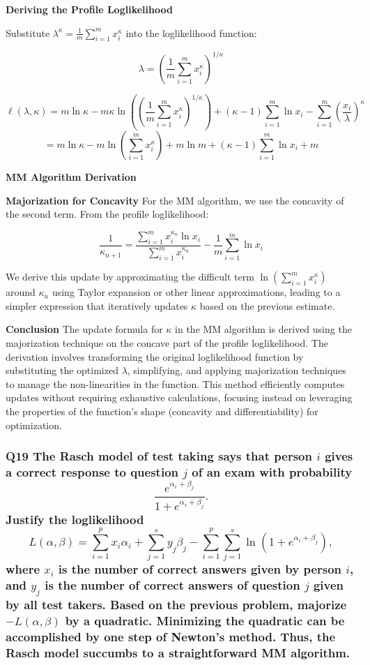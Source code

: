 \documentclass[8pt]{article}
\begin{document}
{\textbf{Deriving the Profile Loglikelihood}

Substitute \(\lambda^\kappa = \frac{1}{m} \sum_{i=1}^m x_i^\kappa\) into the loglikelihood function:

\[
\lambda = \left(\frac{1}{m} \sum_{i=1}^m x_i^\kappa\right)^{1/\kappa}
\]

\[
\ell(\lambda, \kappa) = m \ln \kappa - m \kappa \ln \left( \left(\frac{1}{m} \sum_{i=1}^m x_i^\kappa\right)^{1/\kappa} \right) + (\kappa - 1) \sum_{i=1}^m \ln x_i - \sum_{i=1}^m \left(\frac{x_i}{\lambda}\right)^\kappa
\]
\[
= m \ln \kappa - m \ln \left( \sum_{i=1}^m x_i^\kappa \right) + m \ln m + (\kappa - 1) \sum_{i=1}^m \ln x_i + m
\]

\textbf{MM Algorithm Derivation}

\textbf{Majorization for Concavity}
For the MM algorithm, we use the concavity of the second term. From the profile loglikelihood:

\[
\frac{1}{\kappa_{n+1}} = \frac{\sum_{i=1}^m x_i^{\kappa_n} \ln x_i}{\sum_{i=1}^m x_i^{\kappa_n}} - \frac{1}{m} \sum_{i=1}^m \ln x_i
\]

We derive this update by approximating the difficult term \(\ln \left(\sum_{i=1}^m x_i^\kappa\right)\) around \(\kappa_n\) using Taylor expansion or other linear approximations, leading to a simpler expression that iteratively updates \(\kappa\) based on the previous estimate.

\textbf{Conclusion}
The update formula for \(\kappa\) in the MM algorithm is derived using the majorization technique on the concave part of the profile loglikelihood. The derivation involves transforming the original loglikelihood function by substituting the optimized \(\lambda\), simplifying, and applying majorization techniques to manage the non-linearities in the function. This method efficiently computes updates without requiring exhaustive calculations, focusing instead on leveraging the properties of the function's shape (concavity and differentiability) for optimization.

\subsubsection*{Q19 The Rasch model of test taking says that person \(i\) gives a correct response to question \(j\) of an exam with probability
\[
\frac{e^{\alpha_i + \beta_j}}{1 + e^{\alpha_i + \beta_j}}.
\]
Justify the loglikelihood
\[
L(\alpha, \beta) = \sum_{i=1}^p x_i \alpha_i + \sum_{j=1}^s y_j \beta_j - \sum_{i=1}^p \sum_{j=1}^s \ln(1 + e^{\alpha_i + \beta_j}),
\]
where \(x_i\) is the number of correct answers given by person \(i\), and \(y_j\) is the number of correct answers of question \(j\) given by all test takers. Based on the previous problem, majorize \(-L(\alpha, \beta)\) by a quadratic. Minimizing the quadratic can be accomplished by one step of Newton’s method. Thus, the Rasch model succumbs to a straightforward MM algorithm.}

}
\end{document}
